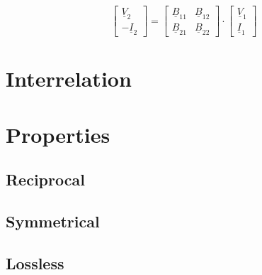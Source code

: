 \documentclass{article}[11pt]
\begin{document}
\begin{equation}
\begin{bmatrix}
 \underline{V}_{\mathrm{2}} \\
-\underline{I}_{\mathrm{2}} 
\end{bmatrix}
=
\begin{bmatrix}
\underline{B}_{\mathrm{11}} & \underline{B}_{\mathrm{12}} \\
\underline{B}_{\mathrm{21}} & \underline{B}_{\mathrm{22}}
\end{bmatrix}
\cdot
\begin{bmatrix}
\underline{V}_{\mathrm{1}} \\
\underline{I}_{\mathrm{1}} 
\end{bmatrix}
\end{equation}

\section{Interrelation}


\section{Properties}

\subsection{Reciprocal}
\subsection{Symmetrical}
\subsection{Lossless}
\end{document}

